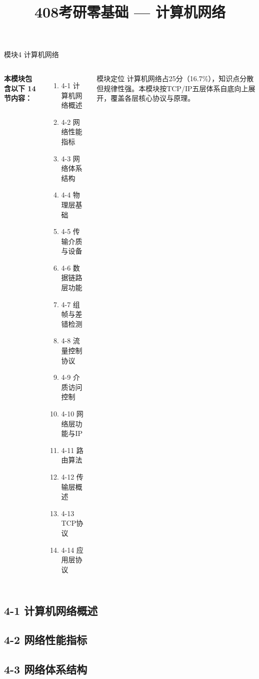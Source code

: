 \documentclass[10pt, aspectratio=169]{beamer}
\title{408考研零基础 --- 计算机网络}
\author{}
\date{}
\begin{document}
\frame{\titlepage}

\begin{frame}{模块4 计算机网络}
    \begin{columns}[T]
        \textbf{本模块包含以下 14 节内容：}
        \begin{enumerate}
            \item 4-1 计算机网络概述
            \item 4-2 网络性能指标
            \item 4-3 网络体系结构
            \item 4-4 物理层基础
            \item 4-5 传输介质与设备
            \item 4-6 数据链路层功能
            \item 4-7 组帧与差错检测
            \item 4-8 流量控制协议
            \item 4-9 介质访问控制
            \item 4-10 网络层功能与IP
            \item 4-11 路由算法
            \item 4-12 传输层概述
            \item 4-13 TCP协议
            \item 4-14 应用层协议
        \end{enumerate}
        \begin{block}{模块定位}
            计算机网络占25分（16.7\%），知识点分散但规律性强。本模块按TCP/IP五层体系自底向上展开，覆盖各层核心协议与原理。
        \end{block}
    \end{columns}
\end{frame}

\subsection{4-1 计算机网络概述}


\subsection{4-2 网络性能指标}


\subsection{4-3 网络体系结构}

\end{document}
